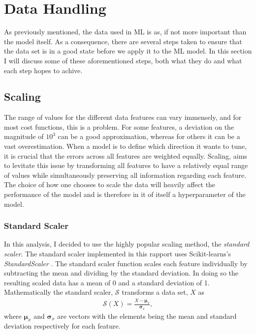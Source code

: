 \section{Data Handling}\label{subsec:Scaling}
As previously mentioned, the data used in \ac{ML} is as, if not more important than the model itself. 
As a consequence, there are several steps taken to ensure that the data set is in a good state before 
we apply it to the \ac{ML} model. In this section I will discuss some of these aforementioned steps, both 
what they do and what each step hopes to achive.
\subsection{Scaling}
The range of values for the different data features can vary immensely, and for most 
cost functions, this is a problem. For some features, a deviation on the magnitude 
of $10^3$ can be a good approximation, whereas for others it can be a vast 
overestimation. When a model is to define which direction it wants to tune, it is 
crucial that the errors across all features are weighted equally. Scaling, aims to levitate 
this issue by transforming all features to have a relatively equal range of values while
simultaneously preserving all information regarding each feature. The choice of how one 
chooses to scale the data will heavily affect the performance of the model and is therefore
in it of itself a hyperparameter of the model. 
\subsubsection{Standard Scaler}\label{subsubsec:StandardScalar}
In this analysis, I decided to use the highly popular scaling method, the \emph{standard scaler}. 
The standard scaler implemented in this rapport uses Scikit-learns's \emph{StandardScaler}
\cite{StandardScaler}. The standard scaler function scales each feature individually by subtracting 
the mean and dividing by the standard deviation. In doing so the resulting scaled data has a mean 
of 0 and a standard deviation of 1. Mathematically the standard scaler, $\mathcal{S}$ transforms 
a data set, $X$ as 
\begin{align}
    \mathcal{S} \left(X\right) = \frac{X - \boldsymbol{\mu} _x}{\boldsymbol{\sigma}_x} ,
\end{align}
where $\boldsymbol{\mu} _x$ and $\boldsymbol{\sigma}_x$ are vectors with the elements being 
the mean and standard deviation respectively for each feature.
